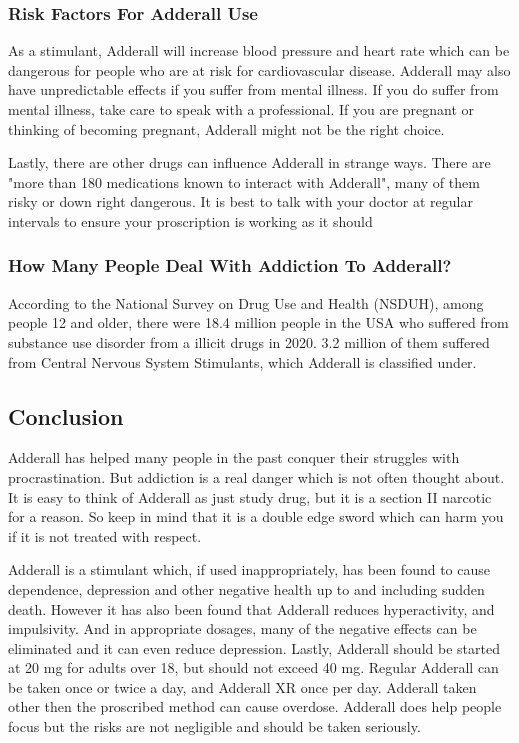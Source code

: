 \documentclass{article}
\begin{document}
            \subsubsection{Risk Factors For Adderall Use}
                As a stimulant, Adderall will increase blood pressure and heart rate which can be dangerous for people who are at risk for cardiovascular disease. Adderall may also have unpredictable effects if you suffer from mental illness. If you do suffer from mental illness, take care to speak with a professional. If you are pregnant or thinking of becoming pregnant, Adderall might not be the right choice. 
                
                Lastly, there are other drugs can influence Adderall in strange ways. 
                There are "more than 180 medications known to interact with Adderall"\cite{fill22}, many of them risky or down right dangerous. It is best to talk with your doctor at regular intervals to ensure your proscription is working as it should
            \subsubsection{How Many People Deal With Addiction To Adderall?}
                According to the National Survey on Drug Use and Health (NSDUH), among people 12 and older, there were 18.4 million people in the USA who suffered from substance use disorder from a illicit drugs in 2020. 3.2 million of them suffered from Central Nervous System Stimulants, which Adderall is classified under\cite{samhsa20}.
                
        \subsection{Conclusion}
            Adderall has helped many people in the past conquer their struggles with procrastination. But addiction is a real danger which is not often thought about.
            It is easy to think of Adderall as just study drug, but it is a section II narcotic for a reason. So keep in mind that it is a double edge sword which can harm you if it is not treated with respect.

            Adderall is a stimulant which, if used inappropriately, has been found to cause dependence, depression and other negative health up to and including sudden death. However it has also been found that Adderall reduces hyperactivity, and impulsivity. And in appropriate dosages, many of the negative effects can be eliminated and it can even reduce depression. Lastly, Adderall should be started at 20 mg for adults over 18, but should not exceed 40 mg. Regular Adderall can be taken once or twice a day, and Adderall XR once per day. Adderall taken other then the proscribed method can cause overdose. Adderall does help people focus but the risks are not negligible and should be taken seriously.
\end{document}
